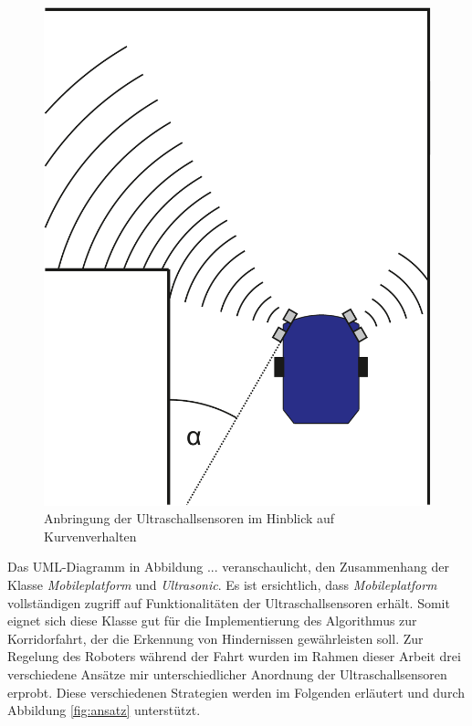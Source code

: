 \documentclass[12pt,a4paper,oneside]{article}
\begin{document}
\begin{spacing}{1.15}
\begin{figure}[!htb]
	\centering
	\includegraphics[scale=.3]{figs/kurve}
	\caption{Anbringung der Ultraschallsensoren im Hinblick auf Kurvenverhalten}
	\label{fig:kurve}
\end{figure}

Das UML-Diagramm in Abbildung ... veranschaulicht, den Zusammenhang der Klasse \textit{Mobileplatform} und \textit{Ultrasonic}. Es ist ersichtlich, dass \textit{Mobileplatform} vollständigen zugriff auf Funktionalitäten der Ultraschallsensoren erhält. Somit eignet sich diese Klasse gut für die Implementierung des Algorithmus zur Korridorfahrt, der die Erkennung von Hindernissen gewährleisten soll. Zur Regelung des Roboters während der Fahrt wurden im Rahmen dieser Arbeit drei verschiedene Ansätze mir unterschiedlicher Anordnung der Ultraschallsensoren erprobt. Diese verschiedenen Strategien werden im Folgenden erläutert und durch Abbildung \ref{fig:ansatz} unterstützt.


\end{spacing}
\end{document}
